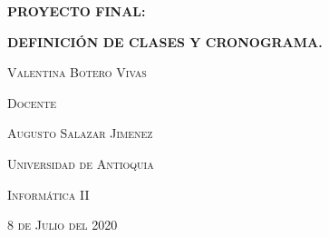 \documentclass{report}   %
\begin{document}
\begin{titlepage}    %
	\centering
	{\huge\bfseries PROYECTO FINAL: \par}
	\vspace{1cm}
	{\huge\bfseries DEFINICIÓN DE CLASES Y CRONOGRAMA.  \par}
    \vspace{3cm}
    {\scshape\large Valentina Botero Vivas \par}
    \vspace{3cm}
      {\scshape\large Docente  \par}
	\vspace{0.5cm}
    {\scshape\large Augusto Salazar Jimenez  \par}
	\vspace{3cm}
	 {\scshape\large Universidad de Antioquia \par}
	\vspace{1cm}
    {\scshape\large Informática II  \par}
	\vspace{1cm}
	{\scshape\large 8 de Julio del 2020 \par}
\end{titlepage}
\end{document}
